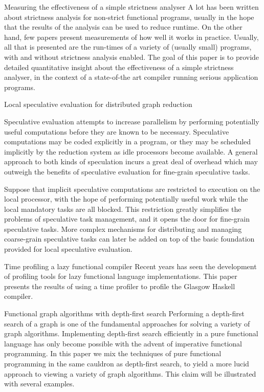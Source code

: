{Measuring the effectiveness of a simple strictness analyser}
{\GlasgowNinetyThree{}}
{
A lot has been written about strictness analysis for non-strict
functional programs, usually in the hope that the results of the
analysis can be used to reduce runtime.  On the other hand, few papers
present measurements of how well it works in practice.  Usually, all
that is presented are the run-times of a variety of (usually small)
programs, with and without strictness analysis enabled.  The goal of
this paper is to provide detailed quantitative insight about the
effectiveness of a simple strictness analyser, in the context of a
state-of-the art compiler running serious application programs.
}

{Local speculative evaluation for distributed graph reduction}
{\GlasgowNinetyThree{}}
{
Speculative evaluation attempts to increase parallelism by
performing potentially useful computations before they are known to be
necessary.  Speculative computations may be coded explicitly in a
program, or they may be scheduled implicitly by the reduction system
as idle processors become available.  A general approach to both kinds
of speculation incurs a great deal of overhead which may outweigh the
benefits of speculative evaluation for fine-grain speculative tasks.  

Suppose that implicit speculative computations are restricted to
execution on the local processor, with the hope of performing
potentially useful work while the local mandatory tasks are all
blocked.  This restriction greatly simplifies the problems of
speculative task management, and it opens the door for fine-grain
speculative tasks.  More complex mechanisms for distributing
and managing coarse-grain speculative tasks can later be added on top of
the basic foundation provided for local speculative evaluation.
}

{Time profiling a lazy functional compiler}
{\GlasgowNinetyThree{}}
{
Recent years has seen the development of profiling tools for lazy
functional language implementations. This paper presents the results
of using a time profiler to profile the Glasgow Haskell compiler.
}

{Functional graph algorithms with depth-first search}
{\GlasgowNinetyThree{}}
{Performing a depth-first search of a graph is one of the fundamental
approaches for solving a variety of graph algorithms.  Implementing
depth-first search efficiently in a pure functional language has only
become possible with the advent of imperative functional programming.
In this paper we mix the techniques of pure functional programming in
the same cauldron as depth-first search, to yield a more lucid
approach to viewing a variety of graph algorithms. This claim will be
illustrated with several examples.}

